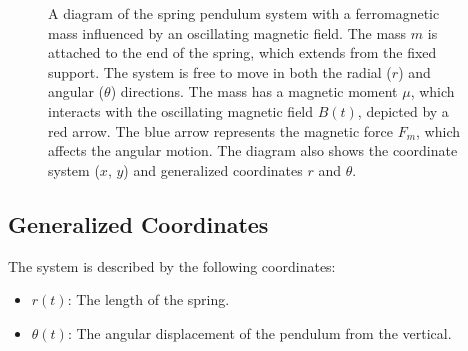 \documentclass[12pt]{article}
\begin{document}
\begin{figure}[h!]
\centering
{}
\caption{A diagram of the spring pendulum system with a ferromagnetic mass influenced by an oscillating magnetic field. The mass \( m \) is attached to the end of the spring, which extends from the fixed support. The system is free to move in both the radial (\( r \)) and angular (\( \theta \)) directions. The mass has a magnetic moment \( \mu \), which interacts with the oscillating magnetic field \( B(t) \), depicted by a red arrow. The blue arrow represents the magnetic force \( F_m \), which affects the angular motion. The diagram also shows the coordinate system (\( x \), \( y \)) and generalized coordinates \( r \) and \( \theta \).}
\label{fig:spring_pendulum}
\end{figure}

\subsection{Generalized Coordinates}
The system is described by the following coordinates:
\begin{itemize}
    \item \( r(t) \): The length of the spring.
    \item \( \theta(t) \): The angular displacement of the pendulum from the vertical.
\end{itemize}
\end{document}
